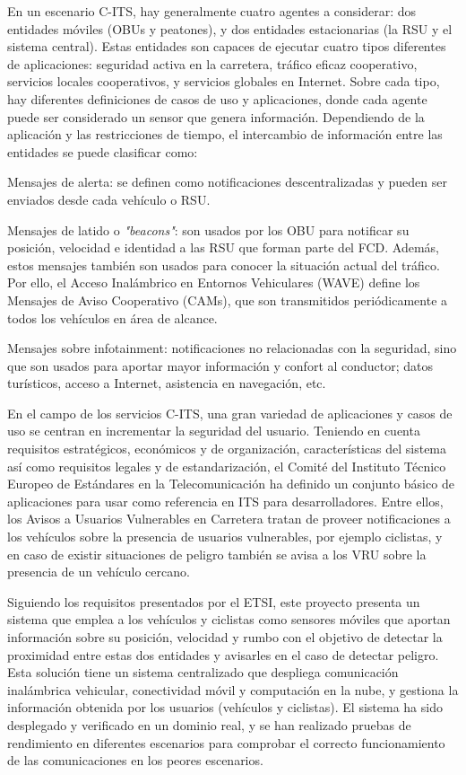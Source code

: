 En un escenario C-ITS, hay generalmente cuatro agentes a considerar: dos entidades móviles (OBUs y peatones), y dos entidades estacionarias (la RSU y el sistema central). Estas entidades son capaces de ejecutar cuatro tipos diferentes de aplicaciones: seguridad activa en la carretera, tráfico eficaz cooperativo, servicios locales cooperativos, y servicios globales en Internet. Sobre cada tipo, hay diferentes definiciones de casos de uso y aplicaciones, donde cada agente puede ser considerado un sensor que genera información. Dependiendo de la aplicación y las restricciones de tiempo, el intercambio de información entre las entidades se puede clasificar como:
\begin{description}
	\item{Mensajes de alerta:} se definen como notificaciones descentralizadas y pueden ser enviados desde cada vehículo o RSU.
	\item{Mensajes de latido o \emph{"beacons"}:} son usados por los OBU para notificar su posición, velocidad e identidad a las RSU que forman parte del FCD. Además, estos mensajes también son usados para conocer la situación actual del tráfico. Por ello, el Acceso Inalámbrico en Entornos Vehiculares (WAVE) define los Mensajes de Aviso Cooperativo (CAMs), que son transmitidos periódicamente a todos los vehículos en área de alcance.
	\item{Mensajes sobre infotainment}: notificaciones no relacionadas con la seguridad, sino que son usados para aportar mayor información y confort al conductor; datos turísticos, acceso a Internet, asistencia en navegación, etc.
\end{description} 

En el campo de los servicios C-ITS, una gran variedad de aplicaciones y casos de uso se centran en incrementar la seguridad del usuario. Teniendo en cuenta requisitos estratégicos, económicos y de organización, características del sistema así como requisitos legales y de estandarización, el Comité del Instituto Técnico Europeo de Estándares en la Telecomunicación ha definido un conjunto básico de aplicaciones para usar como referencia en ITS para desarrolladores. Entre ellos, los Avisos a Usuarios Vulnerables en Carretera tratan de proveer notificaciones a los vehículos sobre la presencia de usuarios vulnerables, por ejemplo ciclistas, y en caso de existir situaciones de peligro también se avisa a los VRU sobre la presencia de un vehículo cercano.

Siguiendo los requisitos presentados por el ETSI, este proyecto presenta un sistema que emplea a los vehículos y ciclistas como sensores móviles que aportan información sobre su posición, velocidad y rumbo con el objetivo de detectar la proximidad entre estas dos entidades y avisarles en el caso de detectar peligro. Esta solución tiene un sistema centralizado que despliega comunicación inalámbrica vehicular, conectividad móvil y computación en la nube, y gestiona la información obtenida por los usuarios (vehículos y ciclistas). El sistema ha sido desplegado y verificado en un dominio real, y se han realizado pruebas de rendimiento en diferentes escenarios para comprobar el correcto funcionamiento de las comunicaciones en los peores escenarios.

